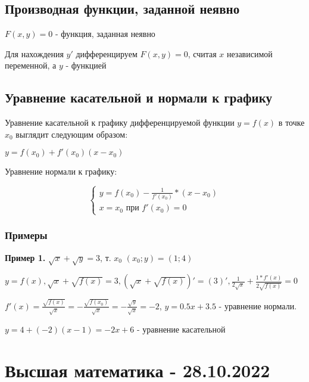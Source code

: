 \documentclass{article}
\begin{document}
\begin{flushleft}
\subsection{Производная функции, заданной неявно}

$F(x, y) = 0$ - функция, заданная неявно

Для нахождения $y'$ дифференцируем $F(x, y) = 0$, считая $x$ независимой переменной, а $y$ - функцией

\subsection{Уравнение касательной и нормали к графику}

Уравнение касательной к графику дифференцируемой функции $y = f(x)$ в точке $x_0$ выглядит следующим образом:

$y = f(x_0) + f'(x_0)(x - x_0)$

Уравнение нормали к графику:

\begin{equation}
    \begin{cases}
        y = f(x_0) - \frac{1}{f'(x_0)} * (x - x_0) \\
        x = x_0 \text{ при } f'(x_0) = 0
    \end{cases}
\end{equation}

\subsubsection{Примеры}

\textbf{Пример 1.} $\sqrt{x} + \sqrt{y} = 3$, т. $x_0$ $(x_0; y) = (1; 4)$  

\hfill

$y = f(x), \sqrt{x} + \sqrt{f(x)} = 3, (\sqrt{x} + \sqrt{f(x)})' = (3)', \frac{1}{2\sqrt{x}} + \frac{1 * f'(x)}{2\sqrt{f(x)}} = 0$

$f'(x) = \frac{\sqrt{f(x)}}{\sqrt{x}} = -\frac{\sqrt{f(x_0)}}{\sqrt{x}} = -\frac{\sqrt{y}}{\sqrt{x}} = -2$, $y = 0.5x + 3.5$ - уравнение нормали. 

\hfill

$y = 4 + (-2)(x - 1) = -2x + 6$ - уравнение касательной

\end{flushleft}

\pagebreak
\section{Высшая математика - 28.10.2022}
\end{document}
